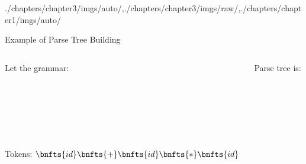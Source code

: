 \begin{graphicspathcontext}{{./chapters/chapter3/imgs/auto/},{./chapters/chapter3/imgs/raw/},{./chapters/chapter1/imgs/auto/}}
\begin{bibunit}[apalike]
\begin{frame}[t]{Example of Parse Tree Building}
	\begin{columns}
		\begin{column}[t]{.7\linewidth}
			Let the grammar: \\[-1cm]
			\begin{small}
			\begin{bnf}
				 \\
				 \\
				 \\
				 \\
			\end{bnf}
			\end{small} \\[1em]
			Tokens: {\small $\bnfts{id}\bnfts{+}\bnfts{id}\bnfts{*}\bnfts{id}$} \\[1em]
			\begin{small}
			\end{small}
		\end{column}
		\begin{column}[t]{.3\linewidth}
			Parse tree is: \\[1em]
		\end{column}
	\end{columns}
\end{frame}


\end{bibunit}
\end{graphicspathcontext}
